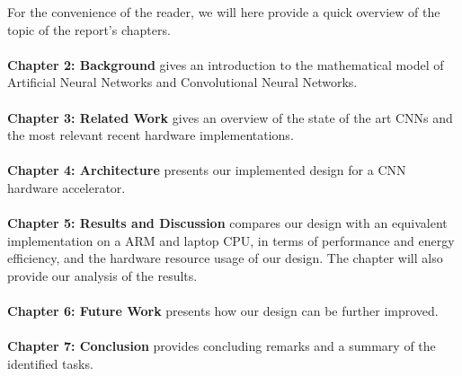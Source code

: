 For the convenience of the reader, we will here provide a quick overview of the topic of the report's chapters. \\ \hfil \\ \hfil
\textbf{Chapter 2: Background} gives an introduction to the mathematical model of Artificial Neural Networks and Convolutional Neural Networks. \\ \hfil \\ \hfil
\textbf{Chapter 3: Related Work} gives an overview of the state of the art CNNs and the most relevant recent hardware implementations. \\ \hfil \\ \hfil
\textbf{Chapter 4: Architecture} presents our implemented design for a CNN hardware accelerator.  \\ \hfil \\ \hfil
\textbf{Chapter 5: Results and Discussion} compares our design with an equivalent implementation on a ARM and laptop CPU, in terms of performance and energy efficiency, and the hardware resource usage of our design. The chapter will also provide our analysis of the results.  \\ \hfil \\ \hfil
\textbf{Chapter 6: Future Work} presents how our design can be further improved. \\ \hfil \\ \hfil
\textbf{Chapter 7: Conclusion} provides concluding remarks and a summary of the identified tasks.\\ \hfil \\ \hfil



